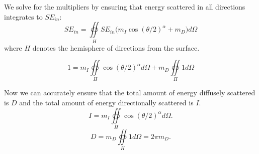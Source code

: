 \documentclass[sensors,article,submit,moreauthors]{Definitions/mdpi}
\begin{document}
We solve for the multipliers by ensuring that energy scattered in all directions integrates to $SE_{in}$:
\begin{equation}
	S E_{in} = \oiint\limits_{H} S E_{in} \Big(m_I\cos({\theta/2})^\alpha +
	m_D\Big)d\Omega
\end{equation}
where $H$ denotes the hemisphere of directions from the surface.

\begin{equation}
    1 = m_I \oiint\limits_{H} \cos({\theta/2})^\alpha d \Omega + m_D
    \oiint\limits_{H} 1 d \Omega
\end{equation}

Now we can accurately ensure that the total amount of energy diffusely scattered is $D$ and the total amount of energy directionally scattered is $I$.
\begin{equation}
    \label{eq:directional-int}
    I = m_I \oiint\limits_{H} \cos({\theta/2})^\alpha d \Omega
    .
\end{equation}
\begin{equation}
    D =  m_D \oiint\limits_{H} 1 d \Omega = 2 \pi m_D
    .
\end{equation}
\end{document}
